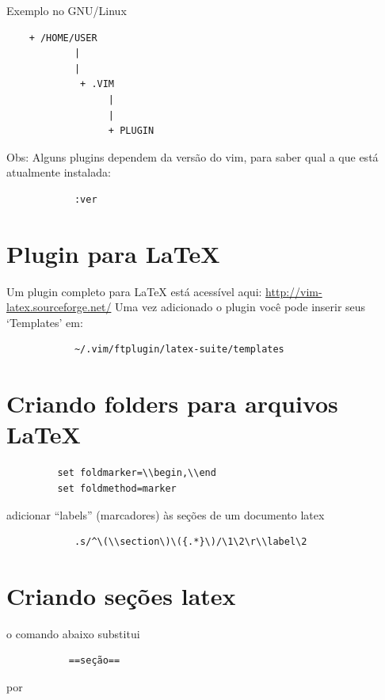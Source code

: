 \documentclass[10pt,a4paper,openany]{book}
\begin{document}
Exemplo no GNU/Linux

\begin{verbatim}
	+ /HOME/USER
			|
			|
			 + .VIM
				  |
				  |
				  + PLUGIN
\end{verbatim}

Obs: Alguns plugins dependem da versão do vim, para saber qual
a que está atualmente instalada:

\begin{verbatim}
			:ver
\end{verbatim}

\section{Plugin para LaTeX}
\label{Plugin para LaTeX}
Um plugin completo para LaTeX está acessível aqui: \url{http://vim-latex.sourceforge.net/}
Uma vez adicionado o plugin você pode inserir seus `Templates'
em:

\begin{verbatim}
			~/.vim/ftplugin/latex-suite/templates
\end{verbatim}


\section{Criando folders para arquivos LaTeX}
\label{Criando folders para arquivos LaTeX}

\begin{verbatim}
		 set foldmarker=\\begin,\\end
		 set foldmethod=marker
\end{verbatim}

adicionar ``labels'' (marcadores) às seções de um documento latex
\begin{verbatim}
			.s/^\(\\section\)\({.*}\)/\1\2\r\\label\2
\end{verbatim}

\section{Criando seções latex}\label{Criando seções latex}
o comando abaixo substitui

\begin{verbatim}
		   ==seção==
\end{verbatim}

   por
\end{document}
